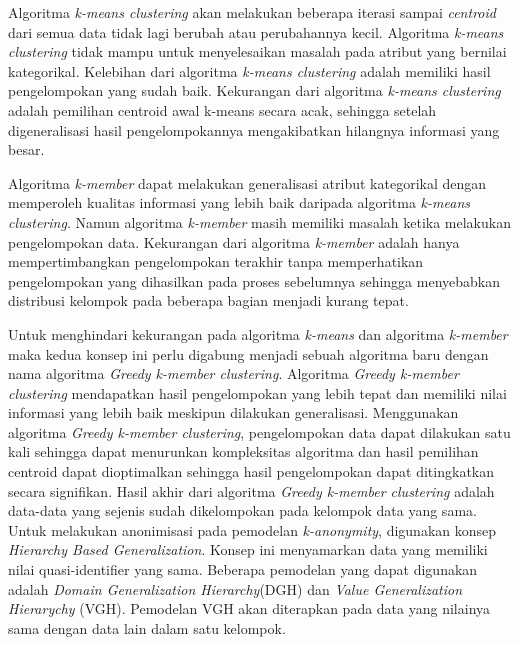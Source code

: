\par Algoritma \textit{k-means clustering} akan melakukan beberapa iterasi sampai \textit{centroid} dari semua data tidak lagi berubah atau perubahannya kecil. Algoritma \textit{k-means clustering} tidak mampu untuk menyelesaikan masalah pada atribut yang bernilai kategorikal. Kelebihan dari algoritma \textit{k-means clustering} adalah memiliki hasil pengelompokan yang sudah baik. Kekurangan dari algoritma \textit{k-means clustering} adalah pemilihan centroid awal k-means secara acak, sehingga setelah digeneralisasi hasil pengelompokannya mengakibatkan hilangnya informasi yang besar.

\par Algoritma \textit{k-member} dapat melakukan generalisasi atribut kategorikal dengan memperoleh kualitas informasi yang lebih baik daripada algoritma \textit{k-means clustering}. Namun algoritma \textit{k-member} masih memiliki masalah ketika melakukan pengelompokan data. Kekurangan dari algoritma \textit{k-member} adalah hanya mempertimbangkan pengelompokan terakhir tanpa memperhatikan pengelompokan yang dihasilkan pada proses sebelumnya sehingga menyebabkan distribusi kelompok pada beberapa bagian menjadi kurang tepat. 

\par Untuk menghindari kekurangan pada algoritma \textit{k-means} dan algoritma \textit{k-member} maka kedua konsep ini perlu digabung menjadi sebuah algoritma baru dengan nama algoritma \textit{Greedy k-member clustering}. Algoritma \textit{Greedy k-member clustering} mendapatkan hasil pengelompokan yang lebih tepat dan memiliki nilai informasi yang lebih baik meskipun dilakukan generalisasi. Menggunakan algoritma \textit{Greedy k-member clustering}, pengelompokan data dapat dilakukan satu kali sehingga dapat menurunkan kompleksitas algoritma dan hasil  pemilihan centroid dapat dioptimalkan sehingga hasil pengelompokan dapat ditingkatkan secara signifikan. Hasil akhir dari algoritma \textit{Greedy k-member clustering} adalah data-data yang sejenis sudah dikelompokan pada kelompok data yang sama. Untuk melakukan anonimisasi pada pemodelan \textit{k-anonymity}, digunakan konsep \textit{Hierarchy Based Generalization}. Konsep ini menyamarkan data yang  memiliki nilai quasi-identifier yang sama. Beberapa pemodelan yang dapat digunakan adalah \textit{Domain Generalization Hierarchy}(DGH) dan \textit{Value Generalization Hierarychy} (VGH). Pemodelan VGH akan diterapkan pada data yang nilainya sama dengan data lain dalam satu kelompok. 


